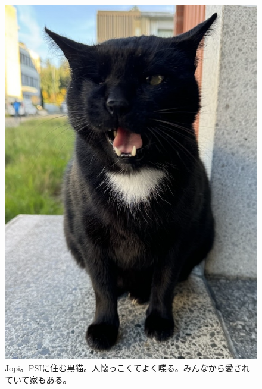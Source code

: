\begin{figure}
  \vspace*{-\intextsep}
  \centering
  \includegraphics[width=0.3\columnwidth]{fig/jopi.png}
  \caption{Jopi。PSIに住む黒猫。人懐っこくてよく喋る。みんなから愛されていて家もある。}
  \label{fig:jopi}
\end{figure}
